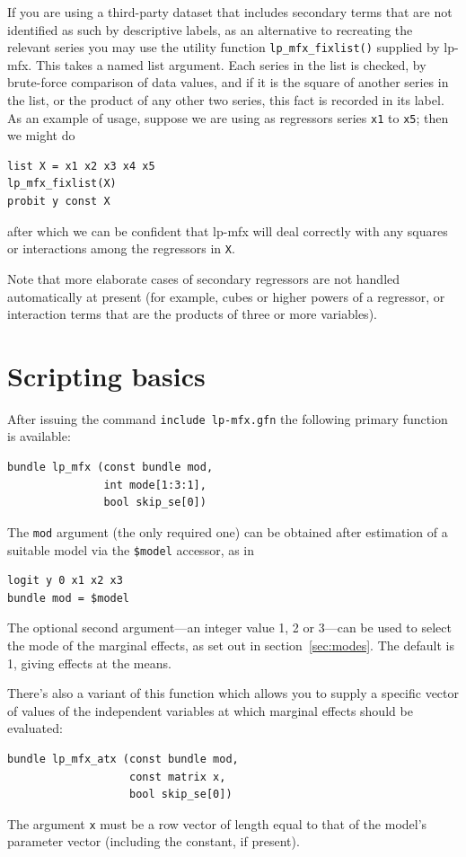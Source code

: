 \documentclass{article}
\begin{document}
If you are using a third-party dataset that includes secondary terms
that are not identified as such by descriptive labels, as an
alternative to recreating the relevant series you may use the utility
function \texttt{lp\_mfx\_fixlist()} supplied by \textsf{lp-mfx}.
This takes a named list argument.  Each series in the list is checked,
by brute-force comparison of data values, and if it is the square of
another series in the list, or the product of any other two series,
this fact is recorded in its label. As an example of usage, suppose we
are using as regressors series \texttt{x1} to \texttt{x5}; then we
might do
\begin{verbatim}
list X = x1 x2 x3 x4 x5
lp_mfx_fixlist(X)
probit y const X
\end{verbatim}
after which we can be confident that \textsf{lp-mfx} will deal
correctly with any squares or interactions among the regressors in
\texttt{X}.

Note that more elaborate cases of secondary regressors are not
handled automatically at present (for example, cubes or higher powers
of a regressor, or interaction terms that are the products of three or
more variables).

\section{Scripting basics}
\label{sec:script-usage}

After issuing the command \texttt{include lp-mfx.gfn} the following
primary function is available:
\begin{verbatim}
bundle lp_mfx (const bundle mod,
               int mode[1:3:1],
               bool skip_se[0])
\end{verbatim}
The \texttt{mod} argument (the only required one) can be obtained
after estimation of a suitable model via the
\verb|$model| accessor, as in
\begin{verbatim}
logit y 0 x1 x2 x3
bundle mod = $model
\end{verbatim}
The optional second argument---an integer value 1, 2 or 3---can be
used to select the mode of the marginal effects, as set out in
section~\ref{sec:modes}. The default is 1, giving effects at the
means.

There's also a variant of this function which allows you to supply a
specific vector of values of the independent variables at which
marginal effects should be evaluated:
\begin{verbatim}
bundle lp_mfx_atx (const bundle mod,
                   const matrix x,
                   bool skip_se[0])
\end{verbatim}
The argument \texttt{x} must be a row vector of length equal to that
of the model's parameter vector (including the constant, if present).
\end{document}
